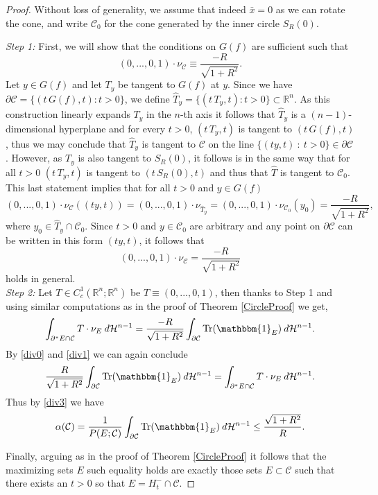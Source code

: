 \documentclass[artcle, 11pt, reqno]{amsart}
\numberwithin{equation}{section}
\newcommand{\R}{\mathbb{R}}
\newcommand{\Hd}{\mathcal{H}}
\newcommand{\ind}{\mathbbm{1}}
\newcommand{\C}{\mathcal{C}}
\newcommand{\contvf}{C^1_c(\R^n; \R^n)}
\newcommand{\dd}{\: d}
\DeclareMathOperator{\Tr}{Tr}
\theoremstyle{plain}
\theoremstyle{definition}
\theoremstyle{remark}
\begin{document}
	\begin{proof}
		Without loss of generality, we assume that indeed $\bar{x}=0$ as we can rotate the cone, and write $\C_0$ for the cone generated by the inner circle $S_R(0)$. 
		
		\textit{Step 1:}
		First, we will show that the conditions on $G(f)$ are sufficient such that 
		\[
		(0,...,0,1) \cdot \nu_\C \equiv \frac{-R}{\sqrt{1+R^2}}.
		\]
		Let $y \in G(f)$ and let $T_y$ be tangent to $G(f)$ at $y$. Since we have $\partial \C = \{(t\,G(f),t) : t>0\}$, we define $\hat{T}_y = \{ (t \, T_y, t) : t>0 \} \subset \R^n$. As this construction linearly expands $T_y$ in the $n$-th axis it follows that $\hat{T}_y$ is a $(n-1)$-dimensional hyperplane and  for every $t>0$, $(t\, T_y, t)$ is tangent to $(t \, G(f), t)$, thus we may conclude that $\hat{T}_y$ is tangent to $\C$ on the line $\{(ty,t) \: : \: t>0 \} \in \partial \C$. 
		However, as $T_y$ is also tangent to $S_R(0)$, it follows is in the same way that for all $t>0$ $(t \, T_y, t)$ is tangent to $(t \, S_R(0), t)$ and thus that $\hat{T}$ is tangent to $\C_0$. This last statement implies that for all $t>0$ and $y \in G(f)$
		\begin{equation} \label{eq:TangCircleProduct}
			(0,...,0,1) \cdot \nu_\C((ty,t)) = (0,...,0,1) \cdot \nu_{\hat{T}_y} = (0,...,0,1) \cdot \nu_{\C_0}(y_0) = \frac{-R}{\sqrt{1+R^2}},
		\end{equation}
		where $y_0 \in \hat{T}_y \cap \C_0$. Since $t > 0$ and $y \in \C_0$ are arbitrary and any point on $\partial \C$ can be written in this form $(ty,t)$, it follows that
		\[
		(0,...,0,1) \cdot \nu_\C = \frac{-R}{\sqrt{1+R^2}}
		\]
		holds in general. \vspace{5mm} \\
		
		\textit{Step 2:} 
		Let $T \in \contvf$ be $T \equiv (0, ...,0,1)$, then thanks to Step 1 and using similar computations as in the proof of Theorem \ref{CircleProof} we get,
		\[
		\int_{\partial^\ast E \cap \C} T \cdot \nu_E \dd\Hd^{n-1} =
		\frac{-R}{\sqrt{1+R^2}} \int_{\partial \C} \Tr(\ind_E) \dd\Hd^{n-1}. 
		\]
		By \eqref{div0} and \eqref{div1} we can again conclude 
		\[
		\frac{R}{\sqrt{1+R^2}} \int_{\partial \C} \Tr(\ind_E) \dd\Hd^{n-1} = \int_{\partial^\ast E \cap \C} T\cdot \nu_E \dd\Hd^{n-1}.
		\]
		Thus by \eqref{div3} we have
		\[
		\alpha(\C) = \frac{1}{P(E;\C)}\int_{\partial \C} \Tr(\ind_E) \dd\Hd^{n-1}  \leq \frac{\sqrt{1+R^2}}{R}.
		\]
		
		Finally, arguing as in the proof of Theorem \ref{CircleProof} it follows that the maximizing sets $E$ such equality holds are exactly those sets $E \subset \C$ such that there exists an $t > 0$ so that $E = H^-_t \cap \C$.
	\end{proof} 
	
\end{document}
